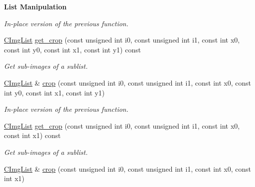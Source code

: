 \begin{Indent}{\bf List Manipulation}
\begin{DoxyCompactItemize}
\begin{DoxyCompactList}\small\item\em In-\/place version of the previous function. \end{DoxyCompactList}\item 
\hypertarget{structcimg__library_1_1_c_img_list_aeec2322b7cd2e8d1736f504d06b3ad40}{\hyperlink{structcimg__library_1_1_c_img_list}{C\-Img\-List} \hyperlink{structcimg__library_1_1_c_img_list_aeec2322b7cd2e8d1736f504d06b3ad40}{get\-\_\-crop} (const unsigned int i0, const unsigned int i1, const int x0, const int y0, const int x1, const int y1) const }\label{structcimg__library_1_1_c_img_list_aeec2322b7cd2e8d1736f504d06b3ad40}

\begin{DoxyCompactList}\small\item\em Get sub-\/images of a sublist. \end{DoxyCompactList}\item 
\hypertarget{structcimg__library_1_1_c_img_list_a0f5e39a5c01060faa8b4c47ff81a4104}{\hyperlink{structcimg__library_1_1_c_img_list}{C\-Img\-List} \& \hyperlink{structcimg__library_1_1_c_img_list_a0f5e39a5c01060faa8b4c47ff81a4104}{crop} (const unsigned int i0, const unsigned int i1, const int x0, const int y0, const int x1, const int y1)}\label{structcimg__library_1_1_c_img_list_a0f5e39a5c01060faa8b4c47ff81a4104}

\begin{DoxyCompactList}\small\item\em In-\/place version of the previous function. \end{DoxyCompactList}\item 
\hypertarget{structcimg__library_1_1_c_img_list_a668ba50f3f10accbc0db78997b226fb9}{\hyperlink{structcimg__library_1_1_c_img_list}{C\-Img\-List} \hyperlink{structcimg__library_1_1_c_img_list_a668ba50f3f10accbc0db78997b226fb9}{get\-\_\-crop} (const unsigned int i0, const unsigned int i1, const int x0, const int x1) const }\label{structcimg__library_1_1_c_img_list_a668ba50f3f10accbc0db78997b226fb9}

\begin{DoxyCompactList}\small\item\em Get sub-\/images of a sublist. \end{DoxyCompactList}\item 
\hypertarget{structcimg__library_1_1_c_img_list_a0ab5a6518c54940e2565d872ee454ff0}{\hyperlink{structcimg__library_1_1_c_img_list}{C\-Img\-List} \& \hyperlink{structcimg__library_1_1_c_img_list_a0ab5a6518c54940e2565d872ee454ff0}{crop} (const unsigned int i0, const unsigned int i1, const int x0, const int x1)}\label{structcimg__library_1_1_c_img_list_a0ab5a6518c54940e2565d872ee454ff0}


\end{DoxyCompactItemize}
\end{Indent}
